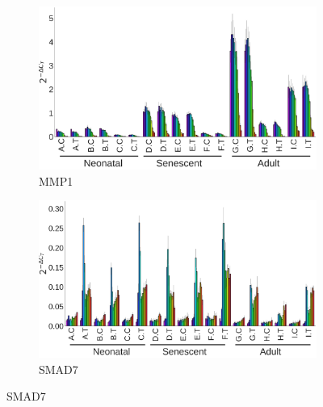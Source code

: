 \documentclass[alpha-refs]{wiley-article}
\begin{document}
\begin{figure}[p]
\begin{minipage}{0.9\textwidth}
		\begin{subfigure}[b]{0.45\textwidth}
			\includegraphics[width=\textwidth]{img/dct_for_publication_no_legend/MMP1}
			\caption{MMP1}\label{MMP1}
		\end{subfigure}\hspace*{\fill}
		\begin{subfigure}[b]{0.45\textwidth}
			\includegraphics[width=\textwidth]{img/dct_for_publication_no_legend/SMAD7}
			\caption{SMAD7}\label{SMAD7}
		\end{subfigure}\hspace*{\fill}
		

\end{minipage}
\end{figure}
\end{document}
